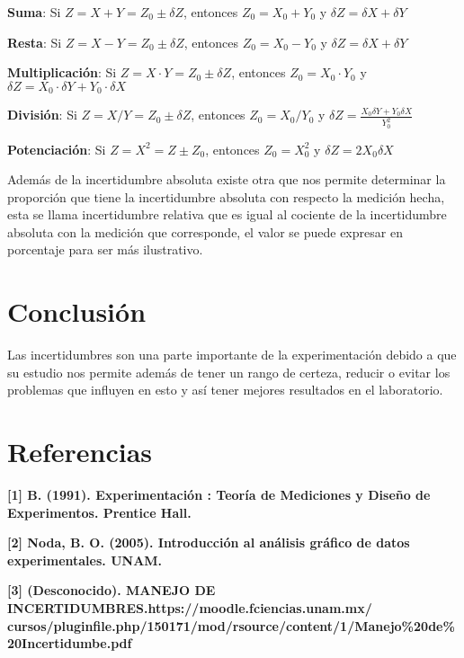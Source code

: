 \documentclass[12pt]{article}
\begin{document}
\textbf{Suma}: Si $Z = X+Y= Z_0 \pm \delta Z$, entonces $Z_0 = X_0 +Y_0$ y $\delta Z = \delta X + \delta Y$

\textbf{Resta}: Si $Z =X-Y = Z_0 \pm \delta Z$, entonces $Z_0 = X_0 - Y_0$ y $\delta Z = \delta X + \delta Y$

\textbf{Multiplicación}: Si $Z= X \cdot Y = Z_0 \pm \delta Z$, entonces $Z_0 = X_0 \cdot Y_0$ y $\delta Z = X_0 \cdot \delta Y + Y_0 \cdot \delta X$

\textbf{División}: Si $Z= X/Y = Z_0 \pm \delta Z$, entonces $Z_0= X_0/Y_0 $ y $\delta Z = \frac{X_0 \delta Y + Y_0 \delta X}{Y_{0}^{2}}$

\textbf{Potenciación}: Si $Z = X^2 = Z \pm Z_0$, entonces $Z_0 = X_{0}^2$ y $\delta Z = 2 X_0 \delta X$




Además de la incertidumbre absoluta existe otra que nos permite determinar la proporción que tiene la incertidumbre absoluta con respecto la medición hecha, esta se llama incertidumbre relativa que es igual al cociente de la incertidumbre absoluta con la medición que corresponde, el valor se puede expresar en porcentaje para ser más ilustrativo.





\section*{Conclusión}

 \noindent Las incertidumbres son una parte importante de la experimentación debido a que su estudio nos permite además de tener un rango de certeza, reducir o evitar los problemas que influyen en esto y así tener mejores resultados en el laboratorio.

\vspace{0cm}

\section*{Referencias}

\textbf{[1] B. (1991). Experimentación : Teoría de Mediciones y Diseño de Experimentos. Prentice Hall.}

\vspace{1cm}

\textbf{[2] Noda, B. O. (2005). Introducción al análisis gráfico de datos experimentales. UNAM.}

\vspace{1cm}



\textbf{[3] (Desconocido). MANEJO DE INCERTIDUMBRES.https://moodle.fciencias.unam.mx/
cursos/pluginfile.php/150171/mod/rsource/content/1/Manejo\%20de\%20Incertidumbe.pdf}



 
\end{document}
